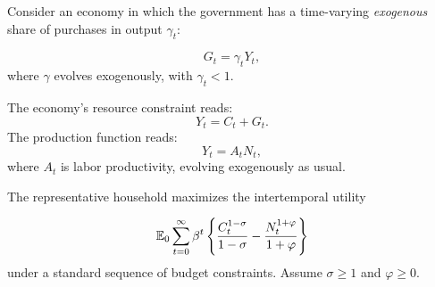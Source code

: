 \documentclass[a4paper,11pt]{article}
\begin{document}
Consider an economy in which the government has a time-varying \textit{exogenous} share of purchases in output $\gamma _{t}$:

\begin{equation*}
G_{t}=\gamma _{t}Y_{t}, 
\end{equation*}
where $\gamma$ evolves exogenously, with $\gamma_t<1$.


The economy's resource constraint reads:
\begin{equation*}
Y_{t}=C_t+G_{t}.
\end{equation*}
The production function reads:
\begin{equation*}
Y_{t}=A_{t}N_{t},
\end{equation*}%
where $A_{t}$ is labor productivity, evolving exogenously as usual.

The representative household maximizes the intertemporal utility

\begin{equation*}
\mathbb{E}_{0} \sum_{t=0}^{\infty }\beta ^{t}\left \{ \frac{%
C_{t}^{1-\sigma }}{1-\sigma }-\frac{N_{t}^{1+\varphi }}{1+\varphi }
\right \}
\end{equation*}%
under a standard sequence of budget constraints. Assume $\sigma \geq 1$ and $\varphi \geq 0$.
\end{document}
